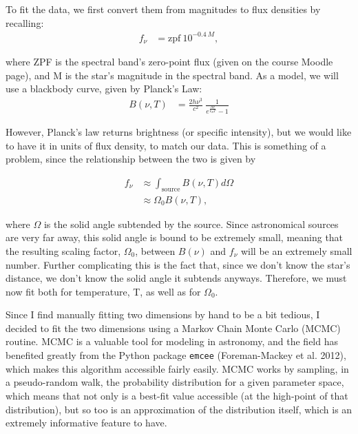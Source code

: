 \documentclass[12pt]{article}
\newenvironment{answer}[2][Answer]{\begin{trivlist}
\item[\hskip \labelsep {\bfseries #1}\hskip \labelsep {\bfseries #2.}]}{\end{trivlist}}
\begin{document}
\begin{answer}{2}
  To fit the data, we first convert them from magnitudes to flux densities by recalling:
  \begin{align*}
    f_\nu &= \text{zpf}\ 10^{-0.4\ M},
  \end{align*}

  where ZPF is the spectral band's zero-point flux (given on the course Moodle page), and M is the star's magnitude in the spectral band. As a model, we will use a blackbody curve, given by Planck's Law:
  \begin{align*}
    B(\nu, T) &= \frac{2h\nu^3}{c^2}\ \frac{1}{e^{\frac{h \nu}{k_B T}} - 1}
  \end{align*}

  However, Planck's law returns brightness (or specific intensity), but we would like to have it in units of flux density, to match our data. This is something of a problem, since the relationship between the two is given by

  \begin{align*}
    f_\nu &\approx \int_{\text{source}} B(\nu, T) d\Omega \\
          &\approx \Omega_0 B(\nu, T),
  \end{align*}

  where $\Omega$ is the solid angle subtended by the source. Since astronomical sources are very far away, this solid angle is bound to be extremely small, meaning that the resulting scaling factor, $\Omega_0$, between $B(\nu)$ and $f_\nu$ will be an extremely small number. Further complicating this is the fact that, since we don't know the star's distance, we don't know the solid angle it subtends anyways. Therefore, we must now fit both for temperature, T, as well as for $\Omega_0$.

  Since I find manually fitting two dimensions by hand to be a bit tedious, I decided to fit the two dimensions using a Markov Chain Monte Carlo (MCMC) routine. MCMC is a valuable tool for modeling in astronomy, and the field has benefited greatly from the Python package \texttt{emcee} (Foreman-Mackey et al. 2012), which makes this algorithm accessible fairly easily. MCMC works by sampling, in a pseudo-random walk, the probability distribution for a given parameter space, which means that not only is a best-fit value accessible (at the high-point of that distribution), but so too is an approximation of the distribution itself, which is an extremely informative feature to have.


\end{answer}
\end{document}
